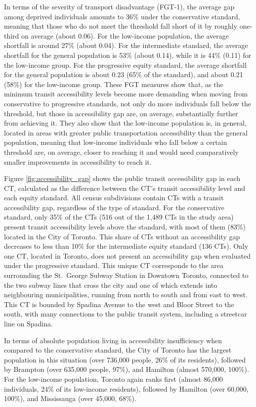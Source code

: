 \documentclass[preprint, 3p,
authoryear]{elsarticle} %
\begin{document}
In terms of the severity of transport disadvantage (FGT-1), the average
gap among deprived individuals amounts to 36\% under the conservative
standard, meaning that those who do not meet the threshold fall short of
it by roughly one-third on average (about 0.06). For the low-income
population, the average shortfall is around 27\% (about 0.04). For the
intermediate standard, the average shortfall for the general population
is 53\% (about 0.14), while it is 44\% (0.11) for the low-income group.
For the progressive equity standard, the average shortfall for the
general population is about 0.23 (65\% of the standard), and about 0.21
(58\%) for the low-income group. These FGT measures show that, as the
minimum transit accessibility levels become more demanding when moving
from conservative to progressive standards, not only do more individuals
fall below the threshold, but those in accessibility gap are, on
average, substantially further from achieving it. They also show that
the low-income population is, in general, located in areas with greater
public transportation accessibility than the general population, meaning
that low-income individuals who fall below a certain threshold are, on
average, closer to reaching it and would need comparatively smaller
improvements in accessibility to reach it.

Figure \ref{fig:accessibility_gap} shows the public transit
accessibility gap in each CT, calculated as the difference between the
CT's transit accessibility level and each equity standard. All census
subdivisions contain CTs with a transit accessibility gap, regardless of
the type of standard. For the conservative standard, only 35\% of the
CTs (516 out of the 1,489 CTs in the study area) present transit
accessibility levels above the standard, with most of them (83\%)
located in the City of Toronto. This share of CTs without an
accessibility gap decreases to less than 10\% for the intermediate
equity standard (136 CTs). Only one CT, located in Toronto, does not
present an accessibility gap when evaluated under the progressive
standard. This unique CT corresponds to the area surrounding the
St.~George Subway Station in Downtown Toronto, connected to the two
subway lines that cross the city and one of which extends into
neighbouring municipalities, running from north to south and from east
to west. This CT is bounded by Spadina Avenue to the west and Bloor
Street to the south, with many connections to the public transit system,
including a streetcar line on Spadina.

In terms of absolute population living in accessibility insufficiency
when compared to the conservative standard, the City of Toronto has the
largest population in this situation (over 736,000 people, 26\% of its
residents), followed by Brampton (over 635,000 people, 97\%), and
Hamilton (almost 570,000, 100\%). For the low-income population, Toronto
again ranks first (almost 86,000 individuals, 24\% of its low-income
residents), followed by Hamilton (over 60,000, 100\%), and Mississauga
(over 45,000, 68\%).
\end{document}

